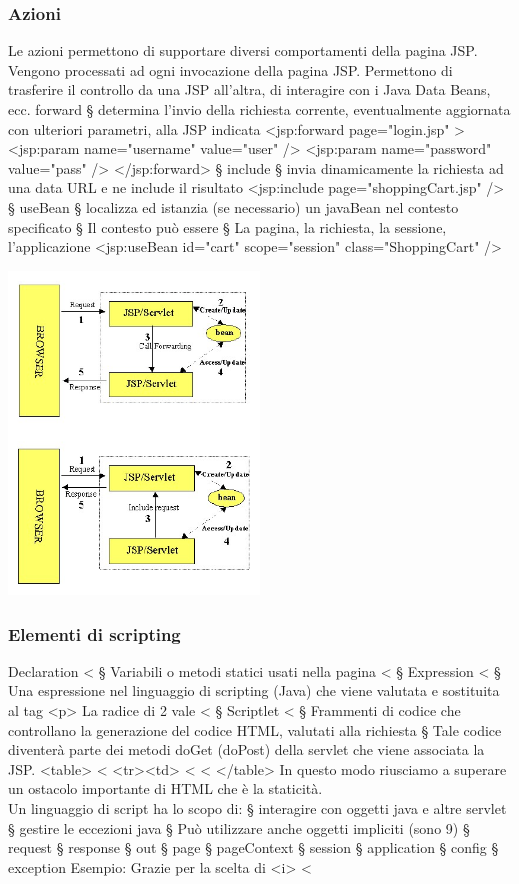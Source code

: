 \begin{itemize}
\subsubsection{Azioni}
Le azioni permettono di supportare diversi comportamenti della pagina JSP.
Vengono processati ad ogni invocazione della pagina JSP. Permettono di trasferire
il controllo da una JSP all'altra, di interagire con i Java Data Beans, ecc.
forward
§ determina l'invio della richiesta corrente, eventualmente
aggiornata con ulteriori parametri, alla JSP indicata
<jsp:forward page="login.jsp" >
<jsp:param name="username" value="user" />
<jsp:param name="password" value="pass" />
</jsp:forward>
§ include
§ invia dinamicamente la richiesta ad una data URL e ne include il risultato
<jsp:include page="shoppingCart.jsp" />
§ useBean
§ localizza ed istanzia (se necessario) un javaBean nel contesto specificato
§ Il contesto può essere
§ La pagina, la richiesta, la sessione, l'applicazione
<jsp:useBean id="cart" scope="session" class="ShoppingCart" />
\begin{center}
    \includegraphics[width=0.5\textwidth]{img/appWeb18.jpg}
\end{center}

\subsubsection{Elementi di scripting}
Declaration <%
§ Variabili o metodi statici usati nella pagina
<%
§ Expression <%
§ Una espressione nel linguaggio di scripting (Java) che viene valutata e sostituita al tag
<p> La radice di 2 vale <%
§ Scriptlet <%
§ Frammenti di codice che controllano la generazione del codice HTML, valutati alla richiesta
§ Tale codice diventerà parte dei metodi doGet (doPost) della servlet che viene associata la JSP.
<table>
<%
<tr><td> <%
<%
</table>
In questo modo riusciamo a superare un ostacolo importante di HTML che è la staticità.
\\Un linguaggio di script ha lo scopo di:
§ interagire con oggetti java e altre servlet
§ gestire le eccezioni java
§ Può utilizzare anche oggetti impliciti (sono 9)
§ request
§ response
§ out
§ page
§ pageContext
§ session
§ application
§ config
§ exception
Esempio:
Grazie per la scelta di <i> <%


\end{itemize}
